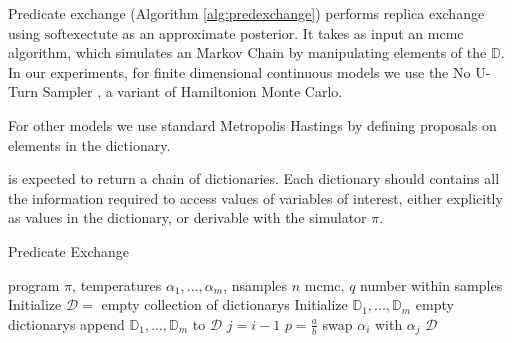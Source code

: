 Predicate exchange (Algorithm \ref{alg:predexchange}) performs replica exchange using $\textrm{softexectute}$ as an approximate posterior.
It takes as input an mcmc algorithm, which simulates an Markov Chain by manipulating elements of the $\mathbb{D}$.
In our experiments, for finite dimensional continuous models we use the No U-Turn Sampler \cite{hoffman2014no}, a variant of Hamiltonion Monte Carlo.

For other models we use standard Metropolis Hastings by defining proposals on elements in the dictionary.


is expected to return a chain of dictionaries.
Each dictionary should contains all the information required to access values of variables of interest, either explicitly as values in the dictionary, or derivable with the simulator $\pi$. 



\begin{algorithm}[tb]
  \caption{Predicate Exchange}
  \label{alg:predexchange}
\begin{algorithmic}
 program $\pi$, temperatures $\alpha_1, ...,\alpha_m$, nsamples $n$
 mcmc, $q$ number within samples
\STATE Initialize $\mathcal{D} = $ empty collection of dictionarys
\STATE Initialize $\mathbb{D}_1,...,\mathbb{D}_m$ empty dictionarys
\REPEAT
      \STATE append $\mathbb{D}_1,...,\mathbb{D}_m$ to $\mathcal{D}$
    \ENDIF
  \ENDFOR
    \STATE $j = i - 1$
    \STATE $p = \frac{a}{b}$
      \STATE swap $\alpha_i$ with $\alpha_j$
    \ENDIF
  \ENDFOR
{}
 $\mathcal{D}$
\end{algorithmic}
\end{algorithm}
